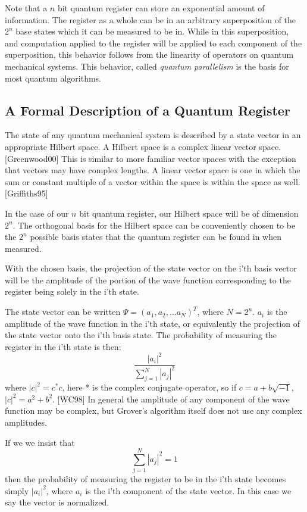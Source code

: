 \documentclass[]{article}
\begin{document}
Note that a $n$ bit quantum register can store an exponential amount
of information.  The register as a whole can be in an arbitrary
superposition of the $2^{n}$ base states which it can be measured to
be in.  While in this superposition, and computation applied to the
register will be applied to each component of the superposition, this
behavior follows from the linearity of operators on quantum mechanical
systems.  This behavior, called \emph{quantum parallelism} is the basis
for most quantum algorithms.

\subsection{A Formal Description of a Quantum Register}

The state of any quantum mechanical system is described by a state
vector in an appropriate Hilbert space.  A Hilbert space is a complex
linear vector space. [Greenwood00] This is similar to more familiar
vector spaces with the exception that vectors may have complex
lengths.  A linear vector space is one in which the sum or constant
multiple of a vector within the space is within the space as
well. [Griffiths95]

In the case of our $n$ bit quantum register, our Hilbert space will be
of dimension $2^{n}$.  The orthogonal basis for the Hilbert space can be
conveniently chosen to be the $2^{n}$ possible basis states that the
quantum register can be found in when measured.

With the chosen basis, the projection of the state vector on the i'th
basis vector will be the amplitude of the portion of the wave function
corresponding to the register being solely in the i'th state.

The state vector can be written $\Psi = (a_{1}, a_{2}, \ldots
a_{N})^{T}$, where $N = 2^{n}$.  $a_{i}$ is the amplitude of the wave
function in the i'th state, or equivalently the projection of the
state vector onto the i'th basis state.  The probability of measuring
the register in the i'th state is then: \[\frac{|a_{i}|^{2}}{\sum_{j = 1}^{N}|a_{j}|^{2}}\] where $|c|^{2} = c^{*}c$, here * is the
complex conjugate operator, so if $c = a+b\sqrt{-1}$, $|c|^{2} = a^{2}+ b^{2}$. [WC98] In general the amplitude of any component of the wave
function may be complex, but Grover's algorithm itself does not use
any complex amplitudes.

If we we insist that \[\sum_{j = 1}^{N} |a_{j}|^{2} = 1\] then the
probability of measuring the register to be in the i'th state becomes
simply $|a_{i}|^2$, where $a_{i}$ is the i'th component of the state
vector.  In this case we say the vector is normalized.
\end{document}
